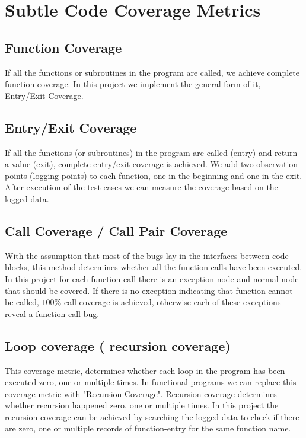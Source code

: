 \documentclass[12pt,a4paper]{report}
\begin{document}
\section{Subtle Code Coverage Metrics}

\subsection{Function Coverage}
If all the functions or subroutines in the program are called, we achieve complete function coverage.
In this project we implement the general form of it, Entry/Exit Coverage.

\subsection{Entry/Exit Coverage}
If all the functions (or subroutines) in the program are called (entry) and return a value (exit), complete entry/exit coverage is achieved.
We add two observation points (logging points) to each function, one in the beginning and one in the exit. After execution of the test cases we can measure the coverage based on the logged data. 

\subsection{Call Coverage / Call Pair Coverage}
With the assumption that most of the bugs lay in the interfaces between code blocks, this method determines whether all the function calls have been executed.
In this project for each function call there is an exception node and normal node that should be covered. If there is no exception indicating that function cannot be called, $100\%$ call coverage is achieved, otherwise each of these exceptions reveal a function-call bug.

\subsection{Loop coverage ( recursion coverage)}
This coverage metric, determines whether each loop in the program has been executed zero, one or multiple times. In functional programs we can replace this coverage metric with "Recursion Coverage". Recursion coverage determines whether recursion happened zero, one or multiple times. In this project the recursion coverage can be achieved by searching the logged data to check if there are zero, one or multiple records of function-entry for the same function name.
\end{document}
